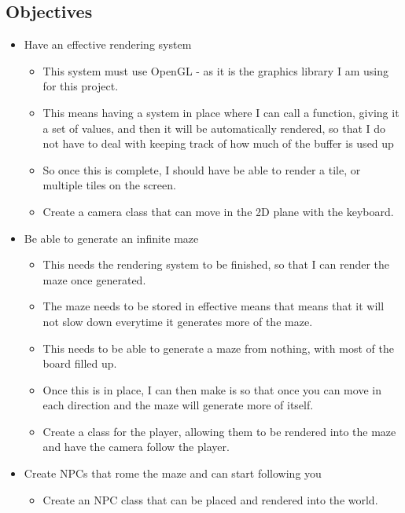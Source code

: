 \documentclass[../Main.tex]{subfiles}
\begin{document}
    \subsection{Objectives}
        \begin{itemize}
            \item Have an effective rendering system
                \begin{itemize}
                    \item This system must use OpenGL - as it is the graphics library I am using for this project.
                    \item This means having a system in place where I can call a function, giving it a set of values, and then it will be automatically rendered, so that I do not have to deal with keeping track of how much of the buffer is used up
                    \item So once this is complete, I should have be able to render a tile, or multiple tiles on the screen.
                    \item Create a camera class that can move in the 2D plane with the keyboard.
                \end{itemize}
            \item Be able to generate an infinite maze
                \begin{itemize}
                    \item This needs the rendering system to be finished, so that I can render the maze once generated.
                    \item The maze needs to be stored in effective means that means that it will not slow down everytime it generates more of the maze.
                    \item This needs to be able to generate a maze from nothing, with most of the board filled up.
                    \item Once this is in place, I can then make is so that once you can move in each direction and the maze will generate more of itself.
                    \item Create a class for the player, allowing them to be rendered into the maze and have the camera follow the player.
                \end{itemize}
            \item Create NPCs that rome the maze and can start following you
                \begin{itemize}
                    \item Create an NPC class that can be placed and rendered into the world.

\end{itemize}
\end{itemize}
\end{document}
